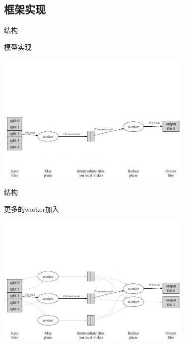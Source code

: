 \documentclass{beamer}
\begin{document}
\subsection{框架实现}
\begin{frame}{结构}
    \begin{block}{模型实现} \begin{center}
    \includegraphics[height=180pt]{keyan/mapreduce.png}\\
    \end{center}\end{block}
\end{frame}

\begin{frame}{结构}
    \begin{block}{更多的worker加入} \begin{center}
    \includegraphics[height=180pt]{keyan/mapreduce1.png}\\
    \end{center}\end{block}
\end{frame}
\end{document}
